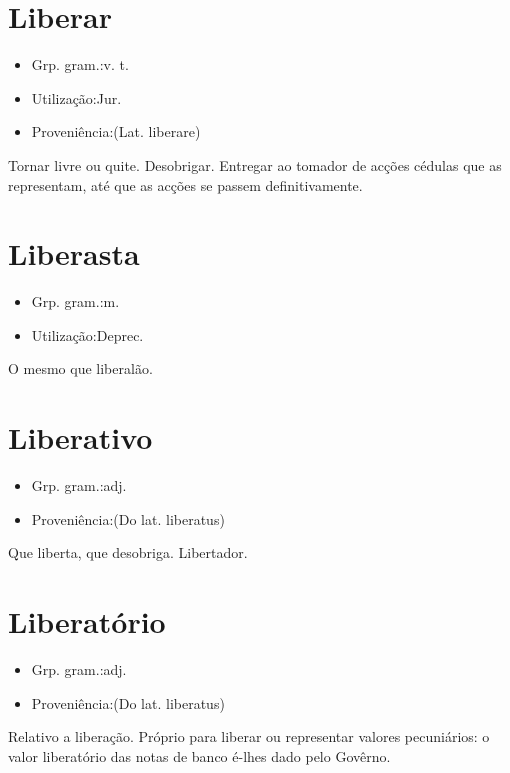 \section{Liberar}
\begin{itemize}
\item {Grp. gram.:v. t.}
\end{itemize}
\begin{itemize}
\item {Utilização:Jur.}
\end{itemize}
\begin{itemize}
\item {Proveniência:(Lat. \textunderscore liberare\textunderscore )}
\end{itemize}
Tornar livre ou quite.
Desobrigar.
Entregar ao tomador de acções cédulas que as representam, até que as acções se passem definitivamente.
\section{Liberasta}
\begin{itemize}
\item {Grp. gram.:m.}
\end{itemize}
\begin{itemize}
\item {Utilização:Deprec.}
\end{itemize}
O mesmo que \textunderscore liberalão\textunderscore .
\section{Liberativo}
\begin{itemize}
\item {Grp. gram.:adj.}
\end{itemize}
\begin{itemize}
\item {Proveniência:(Do lat. \textunderscore liberatus\textunderscore )}
\end{itemize}
Que liberta, que desobriga.
Libertador.
\section{Liberatório}
\begin{itemize}
\item {Grp. gram.:adj.}
\end{itemize}
\begin{itemize}
\item {Proveniência:(Do lat. \textunderscore liberatus\textunderscore )}
\end{itemize}
Relativo a liberação.
Próprio para liberar ou representar valores pecuniários: \textunderscore o valor liberatório das notas de banco é-lhes dado pelo Govêrno\textunderscore .
